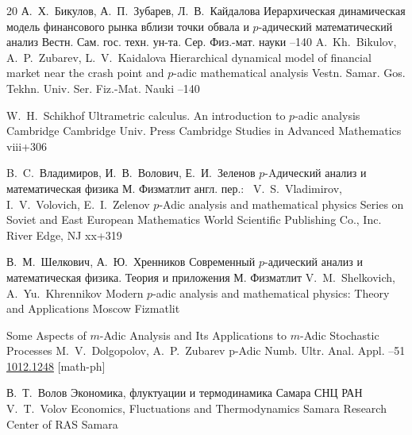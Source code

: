 {\begin{thebibliography}{20}
\by А.~Х.~Бикулов, А.~П.~Зубарев, Л.~В.~Кайдалова
\paper Иерархическая динамическая модель финансового рынка вблизи точки обвала и $p$-адический математический анализ
\jour Вестн. Сам. гос. техн. ун-та. Сер. Физ.-мат. науки
--140
\misctransl
\by A.~Kh.~Bikulov, A.~P.~Zubarev, L.~V.~Kaidalova
\paper Hierarchical dynamical model of financial market near the crash point and $p$-adic mathematical analysis
\jour Vestn. Samar. Gos. Tekhn. Univ. Ser. Fiz.-Mat. Nauki
--140



\by W.~H.~Schikhof
\book Ultrametric calculus. An introduction to $p$-adic analysis
\publaddr Cambridge
\publ Cambridge Univ. Press
\serial Cambridge Studies in Advanced Mathematics
\totalpages viii+306


\by B.~C.~Владимиров, И.~В.~Волович, Е.~И.~Зеленов
\book $p$-Aдический анализ и математическая физика
\publaddr М.
\publ Физматлит
\transl англ. пер.:~
\by V.~S.~Vladimirov, I.~V.~Volovich, E.~I.~Zelenov
\book $p$-Adic analysis and mathematical physics
\serial Series on Soviet and East European Mathematics
\publ World Scientific Publishing Co., Inc.
\publaddr River Edge, NJ
\totalpages xx+319


\by В.~М.~Шелкович, А.~Ю.~Хренников
\book Современный $p$-адический анализ и математическая физика. Теория и приложения
\publaddr М.
\publ Физматлит
\misctransl
\by  V.~M.~Shelkovich, A.~Yu.~Khrennikov
\book Modern $p$-adic analysis and mathematical physics: Theory and Applications
\publaddr Moscow
\publ Fizmatlit 

\paper Some Aspects of $m$-Adic Analysis and Its Applications to $m$-Adic Stochastic Processes
\by M.~V.~Dolgopolov, A.~P.~Zubarev
\jour p-Adic Numb. Ultr. Anal. Appl.
–51
\arxiv \href{http://arxiv.org/abs/1012.1248}{1012.1248} [math-ph]


\by В.~Т.~Волов
\book Экономика, флуктуации и термодинамика
\publaddr Самара
\publ СНЦ РАН
\misctransl 
\by V.~T.~Volov
\book Economics, Fluctuations and Thermodynamics
\publ Samara Research Center of RAS
\publaddr Samara



\end{thebibliography}}
